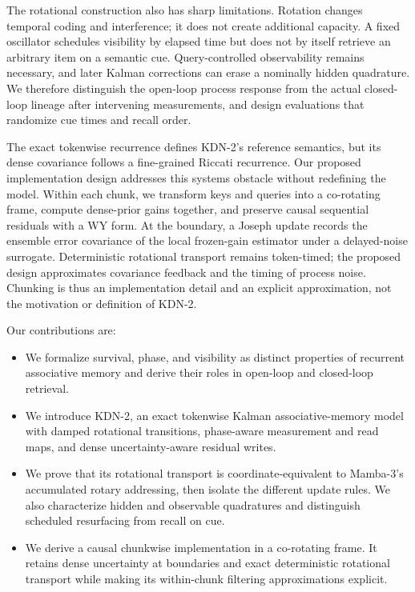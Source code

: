 \documentclass[11pt,letterpaper,logo]{yalearxiv}
\begin{document}
The rotational construction also has sharp limitations. Rotation changes temporal coding and
interference; it does not create additional capacity. A fixed oscillator schedules visibility by
elapsed time but does not by itself retrieve an arbitrary item on a semantic cue. Query-controlled
observability remains necessary, and later Kalman corrections can erase a nominally hidden
quadrature. We therefore distinguish the open-loop process response from the actual closed-loop
lineage after intervening measurements, and design evaluations that randomize cue times and recall
order.

The exact tokenwise recurrence defines KDN-2's reference semantics, but its dense covariance
follows a fine-grained Riccati recurrence. Our proposed implementation design addresses this
systems obstacle
without redefining the model. Within each chunk, we transform keys and queries into a co-rotating
frame, compute dense-prior gains together, and preserve causal sequential residuals with a WY
form. At the boundary, a Joseph update records the ensemble error covariance of the local
frozen-gain estimator under a delayed-noise surrogate. Deterministic rotational transport remains
token-timed; the proposed design approximates covariance feedback and the timing of process noise.
Chunking is thus an
implementation detail and an explicit approximation, not the motivation or definition of KDN-2.

Our contributions are:

\begin{itemize}[leftmargin=1.4em,itemsep=3pt,topsep=2pt]
  \item We formalize survival, phase, and visibility as distinct properties of recurrent
  associative memory and derive their roles in open-loop and closed-loop retrieval.
  \item We introduce KDN-2, an exact tokenwise Kalman associative-memory model with damped
  rotational transitions, phase-aware measurement and read maps, and dense uncertainty-aware
  residual writes.
  \item We prove that its rotational transport is coordinate-equivalent to Mamba-3's accumulated
  rotary addressing, then isolate the different update rules. We also characterize hidden and
  observable quadratures and distinguish scheduled resurfacing from recall on cue.
  \item We derive a causal chunkwise implementation in a co-rotating frame. It retains dense
  uncertainty at boundaries and exact deterministic rotational transport while making its
  within-chunk filtering approximations explicit.
\end{itemize}
\end{document}
